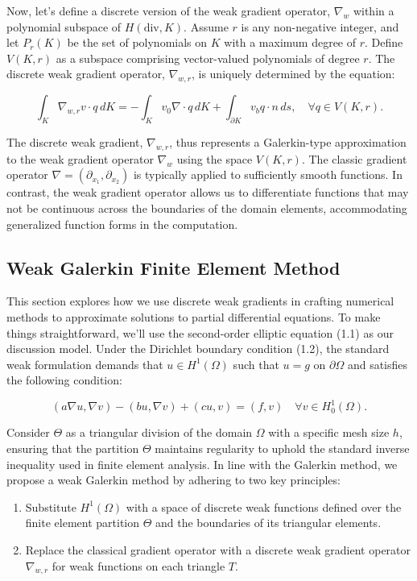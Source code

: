 \documentclass[12pt]{article} %
\begin{document}
Now, let's define a discrete version of the weak gradient operator, \(\nabla_w\) within a polynomial subspace of \(H(\text{div}, K)\). Assume \(r\) is any non-negative integer, and let \(P_r(K)\) be the set of polynomials on \(K\) with a maximum degree of \(r\). Define \(V(K, r)\) as a subspace comprising vector-valued polynomials of degree \(r\). The discrete weak gradient operator, \(\nabla_{w,r}\), is uniquely determined by the equation:

\begin{equation}
    \int_K \nabla_{w,r} v \cdot q \, dK = -\int_K v_0 \nabla \cdot q \, dK + \int_{\partial K} v_b q \cdot n \, ds, \quad \forall q \in V(K, r).
\end{equation}

The discrete weak gradient, \(\nabla_{w,r}\), thus represents a Galerkin-type approximation to the weak gradient operator \(\nabla_w\) using the space \(V(K, r)\). The classic gradient operator \(\nabla = (\partial_{x_1}, \partial_{x_2})\) is typically applied to sufficiently smooth functions. In contrast, the weak gradient operator allows us to differentiate functions that may not be continuous across the boundaries of the domain elements, accommodating generalized function forms in the computation.

\subsection{Weak Galerkin Finite Element Method}

This section explores how we use discrete weak gradients in crafting numerical methods to approximate solutions to partial differential equations. To make things straightforward, we'll use the second-order elliptic equation (1.1) as our discussion model. Under the Dirichlet boundary condition (1.2), the standard weak formulation demands that \(u \in H^1(\Omega)\) such that \(u = g\) on \(\partial\Omega\) and satisfies the following condition:

\begin{equation}
    (a \nabla u, \nabla v) - (bu, \nabla v) + (cu, v) = (f, v) \quad \forall v \in H^1_0(\Omega).
\end{equation}

Consider \(\Theta\) as a triangular division of the domain \(\Omega\) with a specific mesh size \(h\), ensuring that the partition \(\Theta\) maintains regularity to uphold the standard inverse inequality used in finite element analysis. In line with the Galerkin method, we propose a weak Galerkin method by adhering to two key principles:
\begin{enumerate}
    \item Substitute \(H^1(\Omega)\) with a space of discrete weak functions defined over the finite element partition \(\Theta\) and the boundaries of its triangular elements.
    \item Replace the classical gradient operator with a discrete weak gradient operator \(\nabla_{w,r}\) for weak functions on each triangle \(T\).
\end{enumerate}
\end{document}
